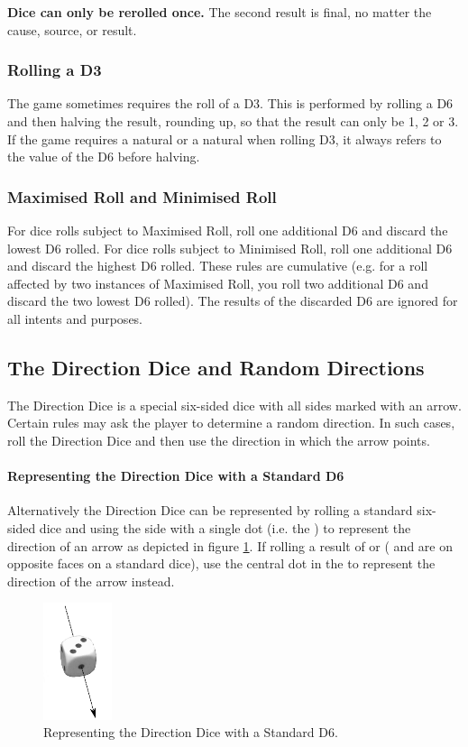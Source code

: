\textbf{Dice can only be rerolled once.} The second result is final, no matter the cause, source, or result.

\subsubsection{Rolling a D3}

The game sometimes requires the roll of a D3. This is performed by rolling a D6 and then halving the result, rounding up, so that the result can only be 1, 2 or 3. If the game requires a natural  or a natural  when rolling D3, it always refers to the value of the D6 before halving.

\subsubsection{Maximised Roll and Minimised Roll}
\label{maximised_roll}

For dice rolls subject to Maximised Roll, roll one additional D6 and discard the lowest D6 rolled. For dice rolls subject to Minimised Roll, roll one additional D6 and discard the highest D6 rolled. These rules are cumulative (e.g. for a roll affected by two instances of Maximised Roll, you roll two additional D6 and discard the two lowest D6 rolled). The results of the discarded D6 are ignored for all intents and purposes.

\subsection{The Direction Dice and Random Directions}
\label{the_direction_dice_and_random_directions}

The Direction Dice is a special six-sided dice with all sides marked with an arrow. Certain rules may ask the player to determine a random direction. In such cases, roll the Direction Dice and then use the direction in which the arrow points.

\paragraph{Representing the Direction Dice with a Standard D6}

Alternatively the Direction Dice can be represented by rolling a standard six-sided dice and using the side with a single dot (i.e. the ) to represent the direction of an arrow as depicted in figure \ref{figure/deviation_dice}. If rolling a result of  or  ( and  are on opposite faces on a standard dice), use the central dot in the  to represent the direction of the arrow instead.

\begin{figure}[!htbp]
\centering
\includegraphics[width=2cm]{pics/deviation_dice.png}
\caption{Representing the Direction Dice with a Standard D6.}
\label{figure/deviation_dice}
\end{figure}

